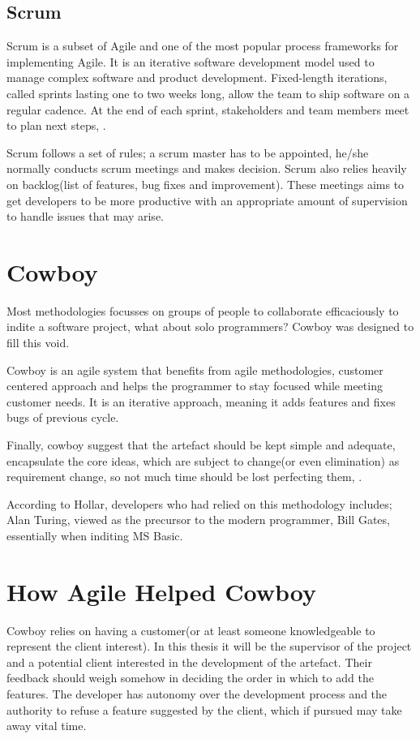 \subsection{Scrum}
Scrum is a subset of Agile and one of the most popular process frameworks for implementing Agile. It is an iterative software development model used to manage complex software and product development. Fixed-length iterations, called sprints lasting one to two weeks long, allow the team to ship software on a regular cadence. At the end of each sprint, stakeholders and team members meet to plan next steps, \cite{FullComp27:online}.
 
Scrum follows a set of rules; a scrum master has to be appointed, he/she normally conducts scrum meetings and makes decision. 
Scrum also relies heavily on backlog(list of features, bug fixes and improvement). These meetings aims to get developers to be more productive with an appropriate amount of supervision to handle issues that may arise.

\section{Cowboy}
 Most methodologies focusses on groups of people to collaborate efficaciously to indite a software project, what about solo programmers? Cowboy was designed to fill this void. 

Cowboy is an agile system that benefits from agile methodologies,
customer centered approach and helps the programmer to stay focused while meeting customer needs. It is an iterative approach, meaning it adds features and fixes bugs of previous cycle.

Finally, cowboy suggest that the artefact should be kept simple and adequate, encapsulate the core ideas, which are subject to change(or even elimination) as requirement change, so not much time should be lost perfecting them, \cite{hollar2006cowboy}.

According to Hollar, developers who had relied on this methodology includes; Alan Turing, viewed as the precursor to the modern programmer, Bill Gates, essentially when inditing MS Basic.

\section{How Agile Helped Cowboy}
Cowboy relies on having a customer(or at least someone knowledgeable to represent the client interest). In this thesis it will be the supervisor of the project and a potential client interested in the development of the artefact. Their feedback should weigh somehow in deciding the order in which to add the features. The developer has autonomy over the development process and the authority to refuse a feature suggested by the client, which if pursued may take away vital time.

